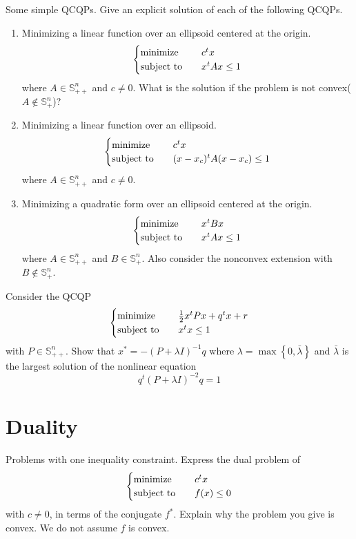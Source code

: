 \begin{problem}[4.21]
    Some simple QCQPs. Give an explicit solution of each of the following QCQPs.
    \begin{enumerate}
        \item Minimizing a linear function over an ellipsoid centered at the origin.\[\begin{cases}
            \operatorname{minimize} \quad &c^tx\\
            \operatorname{subject\ to} \quad &x^tAx \le 1
        \end{cases}\]
        where $A \in \mathbb{S}_{++}^n$ and $c \neq 0$. What is the solution if the problem is not convex($A \notin \mathbb{S}_+^n$)?
        \item Minimizing a linear function over an ellipsoid.\[\begin{cases}
            \operatorname{minimize} \quad &c^tx \\
            \operatorname{subject\ to} \quad &(x - x_c)^t A (x - x_c) \le 1
        \end{cases}\] where $A \in \mathbb{S}_{++}^n$ and $c \neq 0$.
        \item Minimizing a quadratic form over an ellipsoid centered at the origin. \[\begin{cases}
            \operatorname{minimize} \quad &x^tBx \\
            \operatorname{subject\ to} \quad &x^tAx \le 1
        \end{cases}\] where $A \in \mathbb{S}_{++}^n$ and $B \in \mathbb{S}_+^n$. Also consider the nonconvex extension with $B \notin \mathbb{S}_+^n$.
    \end{enumerate}
\end{problem}

\begin{problem}[4.22]
    Consider the QCQP\[\begin{cases}
        \operatorname{minimize} \quad &\frac{1}{2} x^tPx + q^tx + r\\
        \operatorname{subject\ to} \quad &x^tx \le 1
    \end{cases}\]
    with $P \in \mathbb{S}_{++}^n$. Show that $x^* = -(P + \lambda I)^{-1}q$ where $\lambda = \max\left\{0, \bar{\lambda}\right\}$ and $\bar{\lambda}$ is the largest solution of the nonlinear equation \[q^t(P + \lambda I)^{-2}q = 1\]
\end{problem}

\section{Duality}
\begin{problem}[5.3]
    Problems with one inequality constraint. Express the dual problem of\[\begin{cases}
        \operatorname{minimize} \quad &c^tx \\
        \operatorname{subject\ to} \quad &f(x) \le 0
    \end{cases}\] with $c \neq 0$, in terms of the conjugate $f^*$. Explain why the problem you give is convex. We do not assume $f$ is convex.
\end{problem}

